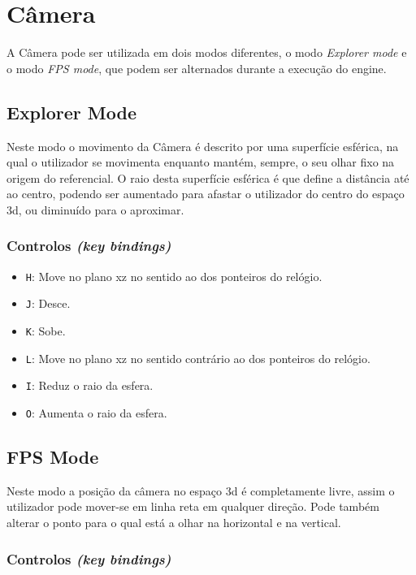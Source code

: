 \documentclass[a4paper]{article}
\begin{document}
\section{Câmera}
A Câmera pode ser utilizada em dois modos diferentes, o modo \textit{Explorer mode} e o modo \textit{FPS mode}, que podem ser alternados durante a execução do engine.

\subsection{Explorer Mode}

Neste modo o movimento da Câmera é descrito por uma superfície esférica, na qual o utilizador se movimenta enquanto mantém, sempre, o seu olhar fixo na origem do referencial. O raio desta superfície esférica é que define a distância até ao centro, podendo ser aumentado para afastar o utilizador do centro do espaço 3d, ou diminuído para o aproximar.

\subsubsection{Controlos \textit{(key bindings)}}

\begin{itemize}
    \item \texttt{H}: Move no plano xz no sentido ao dos ponteiros do relógio.
    \item \texttt{J}: Desce.
    \item \texttt{K}: Sobe.
    \item \texttt{L}: Move no plano xz no sentido contrário ao dos ponteiros do relógio.
    \item \texttt{I}: Reduz o raio da esfera.
    \item \texttt{O}: Aumenta o raio da esfera.
\end{itemize}

\subsection{FPS Mode}

Neste modo a posição da câmera no espaço 3d é completamente livre, assim o utilizador pode mover-se em linha reta em qualquer direção. Pode também alterar o ponto para o qual está a olhar na horizontal e na vertical.

\subsubsection{Controlos \textit{(key bindings)}}
\end{document}
